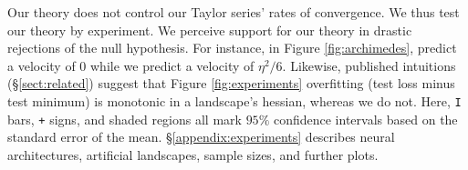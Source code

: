 \documentclass[anon,12pt]{colt2021} %
\newcommand{\ofsix}[1]{
    {\tiny \raisebox{0.04cm}{$\substack{
        \ifthenelse{\equal{#1}{0}}{{\color{moor}\blacksquare}}{\square}
        \ifthenelse{\equal{#1}{2}}{{\color{moor}\blacksquare}}{\square}    
        \ifthenelse{\equal{#1}{4}}{{\color{moor}\blacksquare}}{\square} \\
        \ifthenelse{\equal{#1}{1}}{{\color{moor}\blacksquare}}{\square}    
        \ifthenelse{\equal{#1}{3}}{{\color{moor}\blacksquare}}{\square}
        \ifthenelse{\equal{#1}{5}}{{\color{moor}\blacksquare}}{\square}
    }$}}%
}
\newcommand{\offourseq}[1]{
    {\tiny \raisebox{0.04cm}{$
        \ifthenelse{\equal{#1}{0}}{{\color{moor}\blacksquare}}{\square}
        \ifthenelse{\equal{#1}{1}}{{\color{moor}\blacksquare}}{\square}    
        \ifthenelse{\equal{#1}{2}}{{\color{moor}\blacksquare}}{\square}
        \ifthenelse{\equal{#1}{3}}{{\color{moor}\blacksquare}}{\square}
    $}}%
}
\newcommand{\pmoo}[2]{\texttt{[image: ../plots/\#2]}}
\begin{document}
{\begin{figure}[h!]
        \end{figure}
        Our theory does not control our Taylor series' rates of convergence. 
        We thus test our theory by experiment.  We perceive support for our
        theory in drastic rejections of the null hypothesis.  For instance, in
        Figure \ref{fig:archimedes}, \cite{ch18} predict a velocity of
        $0$ while we predict a velocity of $\eta^2/6$.  Likewise, published
        intuitions (\S\ref{sect:related}) suggest that Figure
        \ref{fig:experiments}\offourseq{3} overfitting (test loss minus test
        minimum) is monotonic in a landscape's hessian, whereas we do not.
        Here, \texttt{I} bars, \texttt{+} signs, and shaded regions all mark
        $95\%$ confidence intervals based on the standard error of the mean.
        \S\ref{appendix:experiments} describes neural architectures, artificial
        landscapes, sample sizes, and further plots.


}
\end{document}
